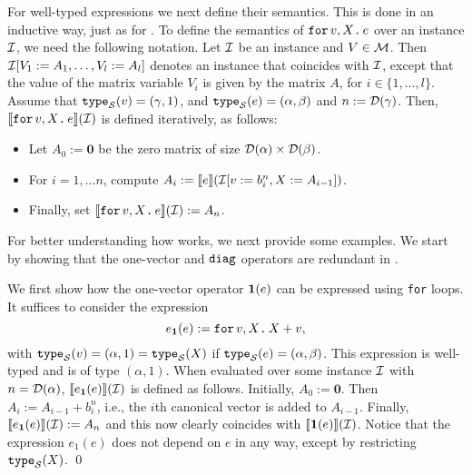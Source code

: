 For well-typed expressions we next define their semantics. This is done in an inductive way, just as for \lang. To define the semantics of $\texttt{for}\, v,X \texttt{.}\, e$ over an instance $\mathcal{I}$, we need the following notation. Let $\mathcal{I}$ be an instance and $V\in \mathcal{M}$. Then $\mathcal{I}[V_1 := A_1, \ldots, V_l:=A_l]$ denotes an instance that coincides with $\mathcal{I}$, except that the value of the matrix variable $V_i$ is given by the matrix $A$, for $i\in\lbrace 1, \ldots, l\rbrace$. Assume that
$\texttt{type}_{\mathcal{S}}(v)= (\gamma,1)$, and $\texttt{type}_{\mathcal{S}}(e) = (\alpha,\beta)$ and $n := \mathcal{D}(\gamma)$. Then, $\llbracket \texttt{for}\, v,X \texttt{.}\, e \rrbracket(\mathcal{I})$ is defined iteratively, as follows:
\begin{itemize}
\item Let $A_0 := \mathbf{0}$ be the zero matrix of size $\mathcal{D}(\alpha)\times \mathcal{D}(\beta)$.
\item For $i=1,\ldots n$, compute $A_i:= \llbracket e \rrbracket(\mathcal{I}[v := b^{n}_i, X:= A_{i-1}])$.
\item Finally, set $\llbracket \texttt{for}\, v,X \texttt{.}\, e \rrbracket(\mathcal{I}):= A_{n}$.
\end{itemize}

For better understanding how \langfor  works, we next provide some  examples.
We start by showing that the one-vector and $\texttt{diag}$ operators are redundant
in \langfor.

\begin{example}\label{ex:onevec}
We first show how the one-vector operator $\mathbf{1}(e)$ can be expressed using \texttt{for} loops.
It suffices to consider the expression
$$e_{\mathbf{1}}(e):=\texttt{for}\, v,X \texttt{.}\, X+v,$$
with $\texttt{type}_{\mathcal{S}}(v)=(\alpha,1)=\texttt{type}_{\mathcal{S}}(X)$ if $\texttt{type}_{\mathcal{S}}(e)=(\alpha,\beta)$. This expression is well-typed
and is of type $(\alpha,1)$. When evaluated over some instance $\mathcal{I}$ with $n=\mathcal{D}(\alpha)$, $\llbracket e_{\mathbf{1}}(e) \rrbracket(\mathcal{I})$ is defined as follows.
Initially, $A_0:=\mathbf{0}$. Then $A_i:=A_{i-1}+b_i^n$, i.e., the $i$th canonical vector is added to $A_{i-1}$.
Finally, $\llbracket e_{\mathbf{1}}(e) \rrbracket(\mathcal{I}):=A_n$ and this now clearly coincides with $\llbracket \mathbf{1}(e) \rrbracket(\mathcal{I})$. Notice that the expression $e_1(e)$ does not depend on $e$ in any way, except by restricting $\texttt{type}_{\mathcal{S}}(X)$. %
\qed
\end{example}


